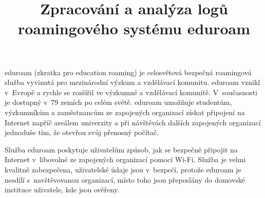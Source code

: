 \documentclass[thesis=M,czech]{FITthesis}[2012/06/26]
\title{Zpracování a analýza logů roamingového systému eduroam}
\begin{document}



\begin{introduction}

  eduroam (zkratka pro education roaming)
  je celosvětová bezpečná roamingová služba vyvinutá pro mezinárodní výzkum a vzdělávací komunitu.
  eduroam vznikl v~Evropě a rychle se rozšířil ve výzkumné a vzdělávací komunitě. 
  V~současnosti je dostupný v~79 zemích po celém světě. \cite{eduroam_where}
  eduroam umožňuje studentům, výzkumníkům a zaměstnancům ze zapojených organizací získat připojení na Internet napříč areálem univerzity
  a při návštěvách dalších zapojených organizací jednoduše tím, že otevřou svůj přenosný počítač. \cite{what_is_eduroam}

  Služba eduroam poskytuje uživatelům způsob, jak se bezpečně připojit na Internet 
  v~libovolné ze zapojených organizací pomocí Wi-Fi.
  \cite{what_is_eduroam}
  Služba je velmi kvalitně zabezpečena, uživatelské údaje jsou v~bezpečí, 
  protože eduroam je nesdílí s~navštěvovanou organizací, místo toho jsou přeposlány do domovské instituce uživatele, kde jsou ověřeny.


\end{introduction}
\end{document}

